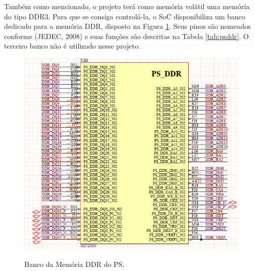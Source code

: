 Também como mencionado, o projeto terá como memória volátil uma memória do tipo DDR3. Para que se consiga controlá-la, o SoC disponibiliza um banco dedicado para a memória DDR, disposto na  Figura \ref{fig:psddr}. Seus pinos são nomeados conforme (JEDEC, 2008) e suas funções são descritas na Tabela \ref{tab:psddr}. O terceiro banco não é utilizado nesse projeto.

\begin{figure}[H]
    \centering
    \caption{Banco da Memória DDR do PS.}
    \includegraphics[scale=0.7]{images/psddr.png}
    \label{fig:psddr}
\end{figure}

